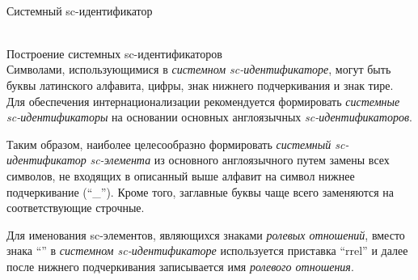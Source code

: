 \begin{frame}{\\Системный sc-идентификатор}
	\topline
	\justifying
	\begin{SCn}
	\end{SCn}
	
\end{frame}

\begin{frame}{\\Построение системных sc-идентификаторов}
	\topline
	\justifying
	\vspace*{\fill}\\
	\footnotesize
	Символами, использующимися в \textit{системном sc-идентификаторе}, могут быть буквы латинского алфавита, цифры, знак нижнего подчеркивания и знак тире. Для обеспечения интернационализации рекомендуется формировать \textit{системные sc-идентификаторы} на основании основных англоязычных \textit{sc-идентификаторов}.
	
	\bigskip
	Таким образом, наиболее целесообразно формировать \textit{системный sc-идентификатор} \textit{sc-элемента} из основного англоязычного путем замены всех символов, не входящих в описанный выше алфавит на символ нижнее подчеркивание (``\_''). Кроме того, заглавные буквы чаще всего заменяются на соответствующие строчные.

	\bigskip	
	Для именования sc-элементов, являющихся знаками \textit{ролевых отношений}, вместо знака ``\scnrolesign'' в \textit{системном sc-идентификаторе} используется приставка ``rrel'' и далее после нижнего подчеркивания записывается имя \textit{ролевого отношения}.
	
\end{frame}


